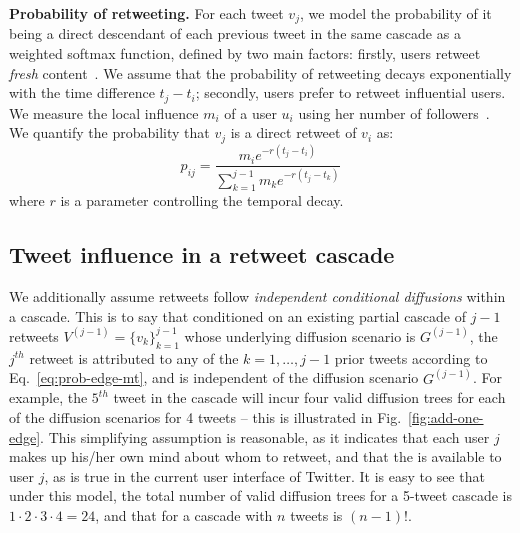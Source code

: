 \documentclass[a4paper,12pt]{article}
\newcommand{\eat}[1]{}
\newcommand{\rev}[1]{{\color{navy}{#1}}}
\newcommand{\TODO}[2]{
 \hl{ {\bf #1}:~#2}
}
\begin{document}
\noindent\textbf{Probability of retweeting.}
For each tweet $v_j$, we model the probability of it being a direct descendant of each previous tweet in the same cascade as a weighted softmax function, defined by two main factors:
firstly, users retweet \emph{fresh} content~\cite{Wu2007}.
We assume that the probability of retweeting decays exponentially with the time difference $t_j - t_i$;
secondly, users prefer to retweet influential users. 
We measure the local influence $m_i$ of a user $u_i$ using her number of followers~\cite{kwak2010twitter,Cha2010}.
We quantify the probability that $v_j$ is a direct retweet of $v_i$ as:
\begin{equation} \label{eq:prob-edge-mt}
	p_{ij} = \frac{m_i e^{-r({t_j-t_i})}}{\sum_{k=1}^{j-1} m_k e^{-r({t_j-t_k})}}
\end{equation}
where 
$r$ is a parameter controlling the temporal decay. 

\subsection{Tweet influence in a retweet cascade}
\label{subsec:user-influence-mt}

We additionally assume retweets follow {\em independent conditional diffusions} within a cascade. 
This is to say that conditioned on an existing partial cascade of $j-1$ retweets $V^{(j-1)}=\{v_k\}_{k=1}^{j-1}$ whose underlying diffusion scenario is $G^{(j-1)}$, the $j^{th}$ retweet is attributed to any of the $k=1,\ldots,j-1$ prior tweets according to Eq.~\ref{eq:prob-edge-mt}, and is independent of the diffusion scenario $G^{(j-1)}$. 
For example, the $5^{th}$ tweet in the cascade will incur four valid diffusion trees for each of the diffusion scenarios for 4 tweets -- this is illustrated in Fig.~\ref{fig:add-one-edge}. 
This simplifying assumption is reasonable, as it indicates that each user $j$ makes up his/her own mind about whom to retweet, and that the \rev{list of previous tweets and retweets} is available to user $j$, as is true in the current user interface of Twitter.
It is easy to see that under this model, the total number of valid diffusion trees for a 5-tweet cascade is $1\cdot 2\cdot 3\cdot 4=24$, and that for a cascade with $n$ tweets is $(n-1)!$.
\end{document}
